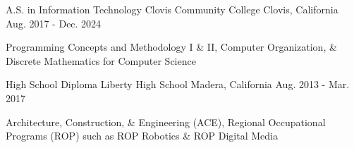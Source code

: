 

\begin{cventries}

  \cventry
    {A.S. in Information Technology} %
    {Clovis Community College} %
    {Clovis, California} %
    {Aug. 2017 - Dec. 2024} %
    {
      \begin{cvitems} %
	  \item {Programming Concepts and Methodology I \& II, Computer Organization, \& Discrete Mathematics for Computer Science}
      \end{cvitems}
    }

  \cventry
    {High School Diploma} %
    {Liberty High School} %
    {Madera, California} %
    {Aug. 2013 - Mar. 2017} %
    {
      \begin{cvitems} %
	  \item {Architecture, Construction, \& Engineering (ACE), Regional Occupational Programs (ROP) such as ROP Robotics \& ROP Digital Media}
      \end{cvitems}
    }

\end{cventries}
